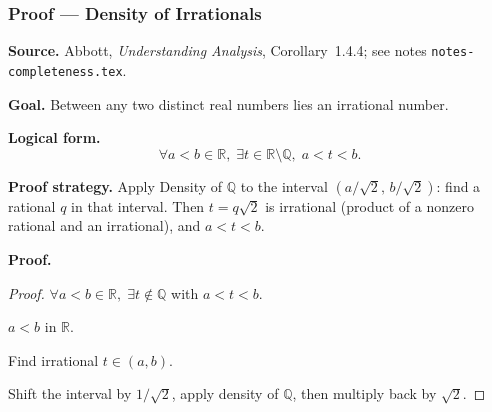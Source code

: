 
\clearpage
{}
\hypertarget{proof-RA-ABB-P-density-irrationals}{}

\subsubsection[Density of Irrationals]{Proof --- Density of Irrationals}

\bigskip

\noindent
\textbf{Source.}
Abbott, \emph{Understanding Analysis}, Corollary~1.4.4; see notes
\texttt{notes-completeness.tex}.

\vspace{0.75em}

\noindent
\textbf{Goal.}
Between any two distinct real numbers lies an irrational number.

\vspace{0.75em}

\noindent
\textbf{Logical form.}
\[
  \forall a < b \in \mathbb{R},\;
  \exists t \in \mathbb{R} \setminus \mathbb{Q},\;
  a < t < b.
\]

\vspace{0.75em}

\noindent
\textbf{Proof strategy.}
Apply Density of $\mathbb{Q}$ to the interval $(a/\sqrt{2},\, b/\sqrt{2})$:
find a rational $q$ in that interval. Then $t = q\sqrt{2}$ is irrational
(product of a nonzero rational and an irrational), and $a < t < b$.

\vspace{0.75em}

\noindent
\textbf{Proof.}
\begin{proof}
\Claim $\forall a < b \in \mathbb{R},\; \exists t \notin \mathbb{Q}$ with $a < t < b$.

\Given $a < b$ in $\mathbb{R}$.

\Goal Find irrational $t \in (a, b)$.

\Strategy Shift the interval by $1/\sqrt{2}$, apply density of $\mathbb{Q}$,
then multiply back by $\sqrt{2}$.

\medskip




\end{proof}

